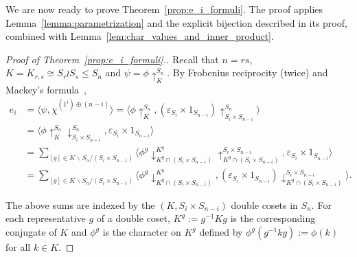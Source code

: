 \documentclass[ALCO,published]{cedram}
\begin{document}
We are now ready to prove Theorem~\ref{prop:e_i_formuli}. 
The proof applies Lemma~\ref{lemma:parametrization} and the explicit bijection described in its proof, combined with Lemma~\ref{lem:char_values_and_inner_product}. 

\begin{proof}[Proof of  Theorem~\ref{prop:e_i_formuli}.]
    Recall that $n=rs$, 
    $K=K_{r,s}\cong S_r\wr S_s\leq S_n$ and 
    $\psi = \phi\uparrow_K^{S_n}$. 
    By Frobenius reciprocity (twice) and 
    Mackey's formula~\cite[(5.2), Problem (5.6)]{Isaacs},
    \begin{equation}\label{Mackey_sum}
    \begin{split}
        e_i 
        &= \langle \psi, \chi^{(1^i) \oplus (n-i)} \rangle 
        = \langle \phi\uparrow_K^{S_n}, (\varepsilon_{S_i} \times 1_{S_{n-i}})\uparrow_{S_i \times S_{n-i}}^{S_n} \rangle \\
        &= \langle {\phi\uparrow_K^{S_n}}\downarrow_{S_i \times S_{n-i}}^{S_n}, \varepsilon_{S_i}\times 1_{S_{n-i}} \rangle \\
        &= 
        \sum_{[g] \in K \backslash S_n / (S_i \times S_{n-i})}
        \langle \phi^g\downarrow^{K^g}_{K^g \cap (S_i \times S_{n-i})}\uparrow_{K^g \cap (S_i \times S_{n-i})}^{S_i \times S_{n-i}}, \varepsilon_{S_i} \times 1_{S_{n-i}} \rangle \\
        &=
        \sum_{[g] \in K \backslash S_n / (S_i \times S_{n-i})}
        \langle \phi^g\downarrow^{K^g}_{K^g \cap (S_i \times S_{n-i})}, (\varepsilon_{S_i} \times 1_{S_{n-i}})\downarrow^{S_i \times S_{n-i}}_{K^g \cap  (S_i \times S_{n-i})} \rangle.
    \end{split}
    \end{equation}
		
    The above sums are indexed by the $(K,S_i\times S_{n-i})$ double cosets in $S_n$. 
    For each representative $g$ of a double coset, 
    $K^g := g^{-1}Kg$ is the corresponding conjugate of $K$ 
    and $\phi^g$ is the character on $K^g$ defined by
    $\phi^g(g^{-1}kg) := \phi(k)$ for all $k \in K$.


\end{proof}
\end{document}
